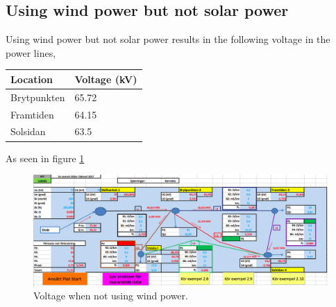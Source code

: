 \documentclass{report}
\newcommand{\case}[1]{\subsection*{#1}}
\begin{document}
\case{Using wind power but not solar power}
Using wind power but not solar power results in the following voltage in the power lines, 

\begin{table}[H] 
\begin{tabular}{ll}
\toprule
Location & Voltage (kV) \\
\midrule
Brytpunkten & 65.72 \\
Framtiden  &  64.15\\
Solsidan & 63.5\\
\bottomrule
\end{tabular} 
\end{table}

As seen in figure \ref{fig_med_vindeby}
\begin{figure}[h]
\label{fig_med_vindeby}
\includegraphics[width=\linewidth]{med_vindeby.png}
\caption{Voltage when not using wind power.} 
\end{figure}
\end{document}
